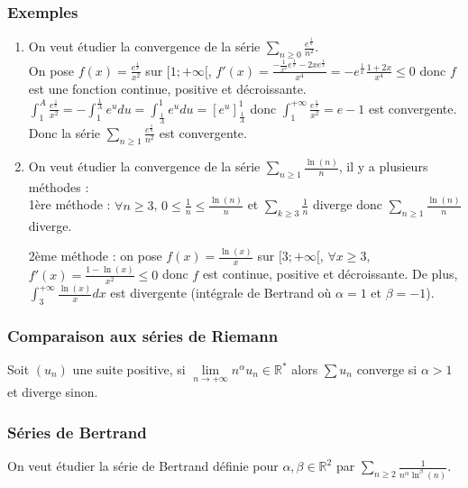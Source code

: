 \documentclass[a4paper,10pt]{book} %
\newcommand{\R}{\mathbb{R}}
\newcommand{\displayAmath}{\displaystyle}
\begin{document}
\subsubsection{Exemples}
\begin{enumerate}
\item On veut étudier la convergence de la série $\displayAmath\sum_{n\geq 0}\frac{e^{\frac{1}{n}}}{n^2}$.\\
On pose $\displayAmath f(x)=\frac{e^{\frac{1}{x}}}{x^2}$ sur $[1;+\infty[$, $\displayAmath f'(x)=\frac{-\frac{1}{x^2}e^{\frac{1}{x}}-2xe^{\frac{1}{x}}}{x^4} =-e^{\frac{1}{x}}\frac{1+2x}{x^4} \leq 0$
donc $f$ est une fonction continue, positive et décroissante.\\

$\displayAmath \int_1^A\frac{e^{\frac{1}{x}}}{x^2}=-\int_1^{\frac{1}{A}}e^udu=\int_{\frac{1}{A}}^{1}e^udu=\left[e^u\right]_{\frac{1}{A}}^1$ donc $\displayAmath \int_1^{+\infty}\frac{e^{\frac{1}{x}}}{x^2}=e-1$ est convergente.\\

Donc la série $\displayAmath \sum_{n\geq 1}\frac{e^\frac{1}{n}}{n^2}$ est convergente.

\item On veut étudier la convergence de la série $\displayAmath \sum_{n\geq 1}\frac{\ln(n)}{n}$, il y a plusieurs méthodes :\\

1ère méthode : $\forall n\geq 3$, $\displayAmath 0\leq \frac{1}{n}\leq \frac{\ln(n)}{n}$ et
$\displayAmath \sum_{k\geq 3} \frac{1}{n}$ diverge donc $\displayAmath \sum_{n\geq 1}\frac{\ln(n)}{n}$ diverge.

2ème méthode :
on pose $\displayAmath f(x)=\frac{\ln(x)}{x}$ sur $[3;+\infty[$, $\forall x\geq 3$, $\displayAmath f'(x)=\frac{1-\ln(x)}{x^2}\leq 0$ donc $f$ est continue, positive et décroissante.
De plus, $\displayAmath \int_3^{+\infty}\frac{\ln(x)}{x}dx$ est divergente (intégrale de Bertrand où $\alpha=1$ et $\beta=-1$).
\end{enumerate}

\subsubsection{Comparaison aux séries de Riemann}
Soit $(u_n)$ une suite positive, si $\lim\limits_{n\rightarrow+\infty}n^\alpha u_n\in\R^*$ alors $\sum u_n$ converge si $\alpha>1$ et diverge sinon.

\subsubsection{Séries de Bertrand}
On veut étudier la série de Bertrand définie pour $\alpha,\beta \in\R^2$ par $\sum_{n\geq 2}\frac{1}{n^\alpha \ln^\beta(n)}$.\\\\
\end{document}
